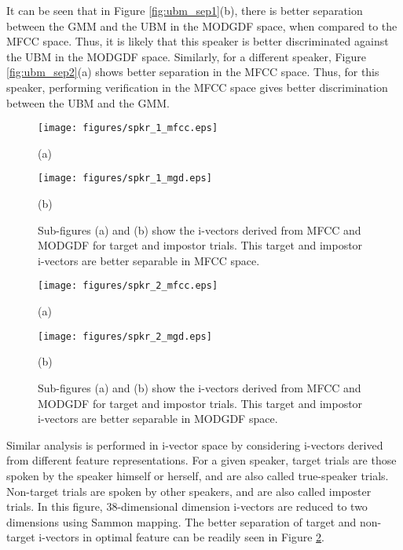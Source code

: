 \documentclass{article}
\begin{document}
It can be seen that in Figure \ref{fig:ubm_sep1}(b), there is  better separation
between the GMM and the UBM in the MODGDF space, when compared to the MFCC
space. Thus, it is likely that this speaker is better discriminated against the
UBM in the MODGDF space. Similarly, for a different speaker, Figure
\ref{fig:ubm_sep2}(a) shows better separation in the MFCC space. Thus, for this
speaker, performing verification in the MFCC space gives better discrimination
between the UBM and the GMM. 

\begin{figure}[h!tb]
\centering 
\begin{minipage}{0.5\textwidth}
\centering 
\texttt{[image: figures/spkr\_1\_mfcc.eps]}
\caption*{(a)}
\label{fig:subfig3}
\end{minipage}%
\begin{minipage}{0.5\textwidth}
\centering 
\texttt{[image: figures/spkr\_1\_mgd.eps]}
\caption*{(b)}
\label{fig:subfig4}
\end{minipage}
\caption{Sub-figures (a) and (b) show the i-vectors derived from MFCC
and MODGDF for target and impostor trials. This target and impostor
i-vectors are better separable in MFCC space.}
\label{fig:ivec_separation}
\end{figure}

\begin{figure}[h!tb]
\centering 
\begin{minipage}{0.5\textwidth}
\centering 
\texttt{[image: figures/spkr\_2\_mfcc.eps]}
\caption*{(a)}
\label{fig:subfig3}
\end{minipage}%
\begin{minipage}{0.5\textwidth}
\centering 
\texttt{[image: figures/spkr\_2\_mgd.eps]}
\caption*{(b)}
\label{fig:subfig4}
\end{minipage}
\caption{Sub-figures (a) and (b) show the i-vectors derived from MFCC
and MODGDF for target and impostor trials. This target and impostor
i-vectors are better separable in MODGDF space.}
\label{fig:ivec_separation}
\end{figure}

Similar analysis is performed in i-vector space by considering i-vectors derived
from different feature representations.  For a given speaker, target trials are
those spoken by the speaker himself or herself, and are also called true-speaker
trials. Non-target trials are spoken by other speakers, and are also called
imposter trials. In this figure, 38-dimensional dimension i-vectors are reduced
to two dimensions using Sammon mapping. The better separation of target and
non-target i-vectors in optimal feature  can be readily seen in Figure
\ref{fig:ivec_separation}.  
\end{document}
